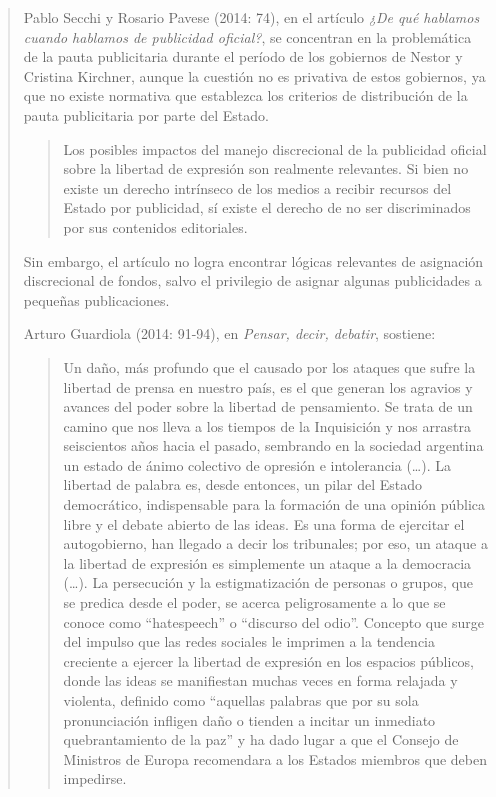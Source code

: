 \begin{quote}
Pablo Secchi y Rosario Pavese (2014: 74), en el artículo \emph{¿De qué hablamos cuando hablamos de publicidad oficial?}, se concentran en la problemática de la pauta publicitaria durante el período de los gobiernos de Nestor y Cristina Kirchner, aunque la cuestión no es privativa de estos gobiernos, ya que no existe normativa que establezca los criterios de distribución de la pauta publicitaria por parte del Estado.

\begin{quote}
	Los posibles impactos del manejo discrecional de la publicidad oficial sobre la libertad de expresión son realmente relevantes. Si bien no existe un derecho intrínseco de los medios a recibir recursos del Estado por publicidad, sí existe el derecho de no ser discriminados por sus contenidos editoriales.
\end{quote}


Sin embargo, el artículo no logra encontrar lógicas relevantes de asignación discrecional de fondos, salvo el privilegio de asignar algunas publicidades a pequeñas publicaciones.

Arturo Guardiola (2014: 91-94), en \emph{Pensar, decir, debatir}, sostiene:

\begin{quote}
	Un daño, más profundo que el causado por los ataques que sufre la libertad de prensa en nuestro país, es el que generan los agravios y avances del poder sobre la libertad de pensamiento. Se trata de un camino que nos lleva a los tiempos de la Inquisición y nos arrastra seiscientos años hacia el pasado, sembrando en la sociedad argentina un estado de ánimo colectivo de opresión e intolerancia (\dots). La libertad de palabra es, desde entonces, un pilar del Estado democrático, indispensable para la formación de una opinión pública libre y el debate abierto de las ideas. Es una forma de ejercitar el autogobierno, han llegado a decir los tribunales; por eso, un ataque a la libertad de expresión es simplemente un ataque a la democracia (\dots). La persecución y la estigmatización de personas o grupos, que se predica desde el poder, se acerca peligrosamente a lo que se conoce como \enquote{hatespeech} o \enquote{discurso del odio}. Concepto que surge del impulso que las redes sociales le imprimen a la tendencia creciente a ejercer la libertad de expresión en los espacios públicos, donde las ideas se manifiestan muchas veces en forma relajada y violenta, definido como \enquote{aquellas palabras que por su sola pronunciación infligen daño o tienden a incitar un inmediato quebrantamiento de la paz} y ha dado lugar a que el Consejo de Ministros de Europa recomendara a los Estados miembros que deben impedirse.
\end{quote}



\end{quote}
